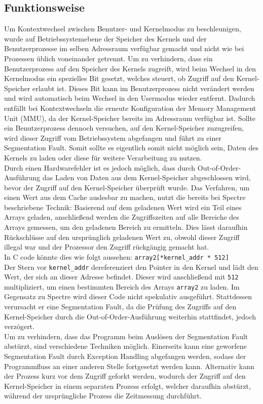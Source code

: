 \subsection{Funktionsweise}
\label{subsec:meltdown_funktionsweise}
Um Kontextwechsel zwischen Benutzer- und Kernelmodus zu beschleunigen, wurde auf Betriebssystemebene der Speicher des Kernels und der Benutzerprozesse im selben Adressraum verfügbar gemacht und nicht wie bei Prozessen üblich voneinander getrennt.
Um zu verhindern, dass ein Benutzerprozess auf den Speicher des Kernels zugreift, wird beim Wechsel in den Kernelmodus ein spezielles Bit gesetzt, welches steuert, ob Zugriff auf den Kernel-Speicher erlaubt ist.
Dieses Bit kann im Benutzerprozess nicht verändert werden und wird automatisch beim Wechsel in den Usermodus wieder entfernt.
Dadurch entfällt bei Kontextwechseln die erneute Konfiguration der Memory Management Unit (MMU), da der Kernel-Speicher bereits im Adressraum verfügbar ist.
Sollte ein Benutzerprozess dennoch versuchen, auf den Kernel-Speicher zuzugreifen, wird dieser Zugriff vom Betriebssystem abgefangen und führt zu einer Segmentation Fault.
Somit sollte es eigentlich somit nicht möglich sein, Daten des Kernels zu laden oder diese für weitere Verarbeitung zu nutzen. \\
Durch einen Hardwarefehler ist es jedoch möglich, dass durch Out-of-Order-Ausführung das Laden von Daten aus dem Kernel-Speicher abgeschlossen wird, bevor der Zugriff auf den Kernel-Speicher überprüft wurde.
Das Verfahren, um einen Wert aus dem Cache auslesbar zu machen, nutzt die bereits bei Spectre beschriebene Technik: Basierend auf dem geladenen Wert wird ein Teil eines Arrays geladen, anschließend werden die Zugriffszeiten auf alle Bereiche des Arrays gemessen, um den geladenen Bereich zu ermitteln.
Dies lässt daraufhin Rückschlüsse auf den ursprünglich geladenen Wert zu, obwohl dieser Zugriff illegal war und der Prozessor den Zugriff rückgängig gemacht hat. \\
In C code könnte dies wie folgt aussehen:
\texttt{array2[*kernel\_addr * 512]}\\
Der Stern vor \texttt{kernel\_addr} dereferenziert den Pointer in den Kernel und lädt den Wert, der sich an dieser Adresse befindet.
Dieser wird anschließend mit \texttt{512} multipliziert, um einen bestimmten Bereich des Arrays \texttt{array2} zu laden.
Im Gegensatz zu Spectre wird dieser Code nicht spekulativ ausgeführt.
Stattdessen verursacht er eine Segmentation Fault, da die Prüfung des Zugriffs auf den Kernel-Speicher durch die Out-of-Order-Ausführung weiterhin stattfindet, jedoch verzögert.\\
Um zu verhindern, dass das Programm beim Auslösen der Segmentation Fault abstürzt, sind verschiedene Techniken möglich.
Einerseits kann eine geworfene Segmentation Fault durch Exception Handling abgefangen werden, sodass der Programmfluss an einer anderen Stelle fortgesetzt werden kann.
Alternativ kann der Prozess kurz vor dem Zugriff geforkt werden, wodurch der Zugriff auf den Kernel-Speicher in einem separaten Prozess erfolgt, welcher daraufhin abstürzt, während der ursprüngliche Prozess die Zeitmessung durchführt.

